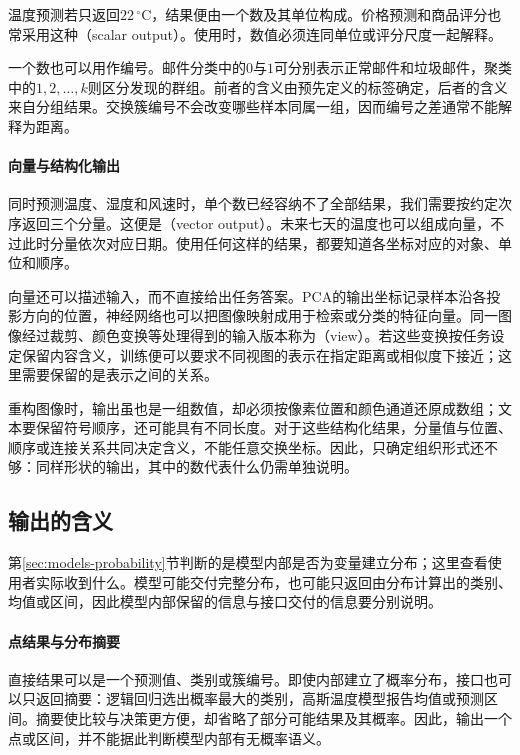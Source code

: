 温度预测若只返回$22\,^{\circ}\mathrm{C}$，结果便由一个数及其单位构成。价格预测和商品评分也常采用这种（scalar output）。使用时，数值必须连同单位或评分尺度一起解释。

一个数也可以用作编号。邮件分类中的$0$与$1$可分别表示正常邮件和垃圾邮件，聚类中的$1,2,\ldots,k$则区分发现的群组。前者的含义由预先定义的标签确定，后者的含义来自分组结果。交换簇编号不会改变哪些样本同属一组，因而编号之差通常不能解释为距离。

\paragraph{向量与结构化输出}
\label{sec:models-vector-output}

同时预测温度、湿度和风速时，单个数已经容纳不了全部结果，我们需要按约定次序返回三个分量。这便是（vector output）。未来七天的温度也可以组成向量，不过此时分量依次对应日期。使用任何这样的结果，都要知道各坐标对应的对象、单位和顺序。

向量还可以描述输入，而不直接给出任务答案。PCA的输出坐标记录样本沿各投影方向的位置，神经网络也可以把图像映射成用于检索或分类的特征向量。同一图像经过裁剪、颜色变换等处理得到的输入版本称为（view）。若这些变换按任务设定保留内容含义，训练便可以要求不同视图的表示在指定距离或相似度下接近；这里需要保留的是表示之间的关系。

重构图像时，输出虽也是一组数值，却必须按像素位置和颜色通道还原成数组；文本要保留符号顺序，还可能具有不同长度。对于这些结构化结果，分量值与位置、顺序或连接关系共同决定含义，不能任意交换坐标。因此，只确定组织形式还不够：同样形状的输出，其中的数代表什么仍需单独说明。

\subsection{输出的含义}
\label{sec:models-output-semantics}

第\ref{sec:models-probability}节判断的是模型内部是否为变量建立分布；这里查看使用者实际收到什么。模型可能交付完整分布，也可能只返回由分布计算出的类别、均值或区间，因此模型内部保留的信息与接口交付的信息要分别说明。

\paragraph{点结果与分布摘要}

直接结果可以是一个预测值、类别或簇编号。即使内部建立了概率分布，接口也可以只返回摘要：逻辑回归选出概率最大的类别，高斯温度模型报告均值或预测区间。摘要使比较与决策更方便，却省略了部分可能结果及其概率。因此，输出一个点或区间，并不能据此判断模型内部有无概率语义。

